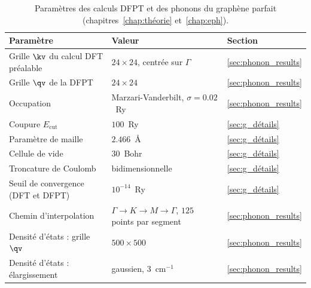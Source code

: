 \begin{table}[htbp]
    \centering
    \caption[Paramètres des calculs DFPT et des phonons.]{Paramètres des calculs DFPT et des phonons du graphène parfait (chapitres~\ref{chap:théorie} et~\ref{chap:eph}).}
    \label{tab:param_dfpt}
    \small
    \setlength{\tabcolsep}{4pt}
    \begin{tabular}{p{} p{} p{}}
        \hline\hline
        Paramètre & Valeur & Section \\
        \hline
        Grille $\kv$ du calcul DFT préalable & $24\times 24$, centrée sur $\Gamma$ & \ref{sec:phonon_results} \\
        Grille $\qv$ de la DFPT & $24\times 24$ & \ref{sec:phonon_results} \\
        Occupation & Marzari-Vanderbilt, $\sigma = 0.02$~Ry & \ref{sec:phonon_results} \\
        Coupure $E_\text{cut}$ & $100$~Ry & \ref{sec:g_détails} \\
        Paramètre de maille & $2.466$~\AA & \ref{sec:g_détails} \\
        Cellule de vide & $30$~Bohr & \ref{sec:g_détails} \\
        Troncature de Coulomb & bidimensionnelle & \ref{sec:g_détails} \\
        Seuil de convergence (DFT et DFPT) & $10^{-14}$~Ry & \ref{sec:g_détails} \\
        Chemin d'interpolation & $\Gamma\to K\to M\to\Gamma$, $125$ points par segment & \ref{sec:phonon_results} \\
        Densité d'états : grille $\qv$ & $500\times 500$ & \ref{sec:phonon_results} \\
        Densité d'états : élargissement & gaussien, $3$~cm$^{-1}$ & \ref{sec:phonon_results} \\
        \hline\hline
    \end{tabular}
\end{table}

